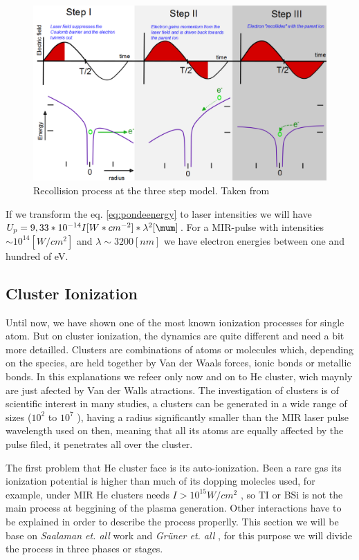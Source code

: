\begin{figure}[hbtp]
\centering
\includegraphics[width=12 cm]{../Images/ponderomotive steps.png}
\caption[Ponderomotive 3 steps]{Recollision  process at the three step model. Taken from \cite{krishnan_doped_2011}}
\end{figure}


If we transform the eq. \ref{eq:pondeenergy} to laser intensities we will have $U_{p} = 9,33*10^{-14}I[W*cm^{-2}] * \lambda^{2}[\mum]$. For a MIR-pulse with intensities $\sim 10^{14} [W/cm^{2}]$ and $\lambda \sim 3200 [nm]$ we have electron energies between one and hundred of eV.

\subsection{Cluster Ionization}

Until now, we have shown one of the most known ionization processes for single atom. But on cluster ionization, the dynamics are quite different and need a bit more detailled. Clusters are combinations of atoms or molecules which, depending on the species, are held together by Van der Waals forces, ionic bonds or metallic bonds. In this explanations we refeer only now and on to He cluster, wich maynly are just afected by Van der Walls atractions. The investigation of clusters is of scientific interest in many studies, a clusters can be generated in a wide range of sizes ($10^{2}$ to $10^{7}$ )\cite{stienkemeier_spectroscopy_2006}, having a radius significantly smaller than the MIR laser pulse wavelength used on then, meaning that all its atoms are equally affected by the pulse filed, it penetrates all over the cluster.


The first problem that He cluster face is its auto-ionization. Been a rare gas its ionization potential is higher than much of its dopping molecles used, for example, under MIR He clusters needs $I > 10^{15} W/cm^{2}$ , so TI or BSi is not the main process at beggining of the plasma generation. Other interactions have to be explained in order to describe the process properlly. This section we will be base on \textit{Saalaman et. all} work \cite{saalmann_mechanisms_2006} and \textit{Grüner et. all} \cite{gruner_femtosekundenspektroskopie_2013}, for this purpose we will divide the process in three phases or stages.


